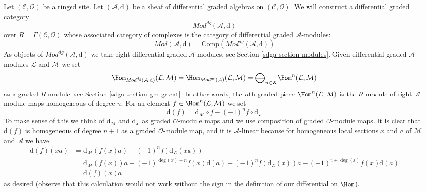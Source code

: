 \medskip\noindent
Let $(\mathcal{C}, \mathcal{O})$ be a ringed site.
Let $(\mathcal{A}, \text{d})$ be a sheaf of differential graded algebras
on $(\mathcal{C}, \mathcal{O})$. We will construct
a differential graded category
$$
\textit{Mod}^{dg}(\mathcal{A}, \text{d})
$$
over $R = \Gamma(\mathcal{C}, \mathcal{O})$ whose associated category
of complexes is the category of differential graded $\mathcal{A}$-modules:
$$
\textit{Mod}(\mathcal{A}, \text{d}) =
\text{Comp}(\textit{Mod}^{dg}(\mathcal{A}, \text{d}))
$$
As objects of $\textit{Mod}^{dg}(\mathcal{A}, \text{d})$ we take right
differential graded $\mathcal{A}$-modules, see
Section \ref{sdga-section-modules}. Given differential graded
$\mathcal{A}$-modules $\mathcal{L}$ and $\mathcal{M}$ we set
$$
\Hom_{\textit{Mod}^{dg}(\mathcal{A}, \text{d})}(\mathcal{L}, \mathcal{M}) =
\Hom_{\textit{Mod}^{gr}(\mathcal{A})}(\mathcal{L}, \mathcal{M}) =
\bigoplus\nolimits_{n \in \mathbf{Z}} \Hom^n(\mathcal{L}, \mathcal{M})
$$
as a graded $R$-module, see Section \ref{sdga-section-gm-gr-cat}.
In other words, the $n$th graded piece
$\Hom^n(\mathcal{L}, \mathcal{M})$ is the $R$-module of right
$\mathcal{A}$-module maps homogeneous of degree $n$.
For an element $f \in \Hom^n(\mathcal{L}, \mathcal{M})$ we set
$$
\text{d}(f) =
\text{d}_\mathcal{M} \circ f - (-1)^n f \circ \text{d}_\mathcal{L}
$$
To make sense of this we think of $\text{d}_\mathcal{M}$ and
$\text{d}_\mathcal{L}$ as graded $\mathcal{O}$-module maps and
we use composition of graded $\mathcal{O}$-module maps.
It is clear that $\text{d}(f)$ is homogeneous of
degree $n + 1$ as a graded $\mathcal{O}$-module map, and it is
$\mathcal{A}$-linear because for homogeneous local sections $x$ and $a$
of $\mathcal{M}$ and $\mathcal{A}$ we have
\begin{align*}
\text{d}(f)(xa)
& =
\text{d}_\mathcal{M}(f(x) a) - (-1)^n f (\text{d}_\mathcal{L}(xa)) \\
& =
\text{d}_\mathcal{M}(f(x)) a + (-1)^{\deg(x) + n} f(x) \text{d}(a)
- (-1)^n f(\text{d}_\mathcal{L}(x)) a - (-1)^{n + \deg(x)} f(x) \text{d}(a) \\
& = \text{d}(f)(x) a
\end{align*}
as desired (observe that this calculation would not work without the
sign in the definition of our differential on $\Hom$).

